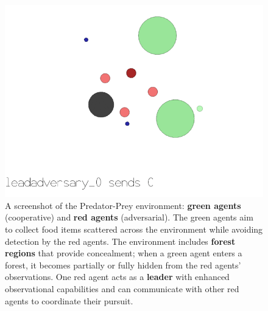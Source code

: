 \documentclass[pdflatex,sn-mathphys-num]{sn-jnl}%
\theoremstyle{thmstyleone}%
\theoremstyle{thmstyletwo}%
\theoremstyle{thmstylethree}%
\begin{document}
\begin{figure}[h!]
    \centering
    \includegraphics[trim=0cm 4.5cm 0cm 1cm, clip,width=0.6\linewidth]{figures/predator_prey.png}
    \caption{A screenshot of the Predator-Prey environment: \textbf{green agents} (cooperative) and \textbf{red agents} (adversarial). The green agents aim to collect food items scattered across the environment while avoiding detection by the red agents. The environment includes \textbf{forest regions} that provide concealment; when a green agent enters a forest, it becomes partially or fully hidden from the red agents' observations. One red agent acts as a \textbf{leader} with enhanced observational capabilities and can communicate with other red agents to coordinate their pursuit.}
    \label{fig:predator_prey}
\end{figure}
%
\end{document}
